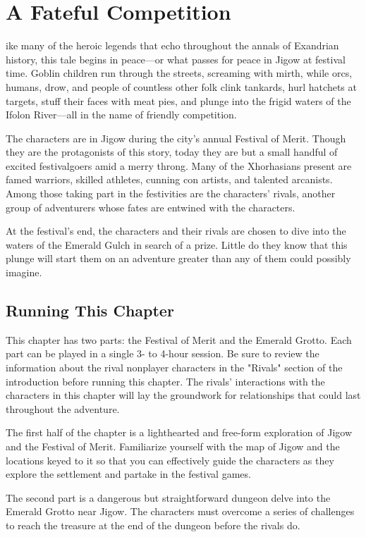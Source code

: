 \documentclass[10pt,a4paper,twoside,bg=print,twocolumn,openany,nodeprecatedcode]{dndbook}
\begin{document}
\chapter{A Fateful Competition}
ike many of the heroic legends that echo throughout the annals of Exandrian history, this tale begins in peace—or what passes for peace in Jigow at festival time. Goblin children run through the streets, screaming with mirth, while orcs, humans, drow, and people of countless other folk clink tankards, hurl hatchets at targets, stuff their faces with meat pies, and plunge into the frigid waters of the Ifolon River—all in the name of friendly competition.


The characters are in Jigow during the city's annual Festival of Merit. Though they are the protagonists of this story, today they are but a small handful of excited festivalgoers amid a merry throng. Many of the Xhorhasians present are famed warriors, skilled athletes, cunning con artists, and talented arcanists. Among those taking part in the festivities are the characters' rivals, another group of adventurers whose fates are entwined with the characters.

At the festival's end, the characters and their rivals are chosen to dive into the waters of the Emerald Gulch in search of a prize. Little do they know that this plunge will start them on an adventure greater than any of them could possibly imagine.

\section{Running This Chapter}
This chapter has two parts: the Festival of Merit and the Emerald Grotto. Each part can be played in a single 3- to 4-hour session. Be sure to review the information about the rival nonplayer characters in the "Rivals" section of the introduction before running this chapter. The rivals' interactions with the characters in this chapter will lay the groundwork for relationships that could last throughout the adventure.

The first half of the chapter is a lighthearted and free-form exploration of Jigow and the Festival of Merit. Familiarize yourself with the map of Jigow and the locations keyed to it so that you can effectively guide the characters as they explore the settlement and partake in the festival games.

The second part is a dangerous but straightforward dungeon delve into the Emerald Grotto near Jigow. The characters must overcome a series of challenges to reach the treasure at the end of the dungeon before the rivals do.
\end{document}
